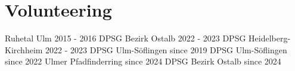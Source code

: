 \documentclass{cv}
\begin{document}
        \section{Volunteering}
        \resumeSubHeadingListStart\vspace*{1mm}
            {Ruhetal Ulm}
            {2015 - 2016}
            {DPSG Bezirk Ostalb}
            {2022 - 2023}
            {DPSG Heidelberg-Kirchheim}
            {2022 - 2023}
            {DPSG Ulm-Söflingen}
            {since 2019}
            {DPSG Ulm-Söflingen}
            {since 2022}
            {Ulmer Pfadfinderring}
            {since 2024}
            {DPSG Bezirk Ostalb}
            {since 2024}
        \resumeSubHeadingListEnd
\end{document}
